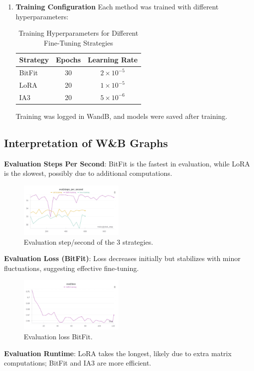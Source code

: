 \documentclass[11pt]{article}
\begin{document}
\begin{enumerate}
\item \textbf{Training Configuration}
Each method was trained with different hyperparameters:
\begin{table}[ht]
\centering
\begin{tabular}{lcc}
\hline
\textbf{Strategy} & \textbf{Epochs} & \textbf{Learning Rate} \\
\hline
BitFit & 30 & \(2 \times 10^{-5}\) \\
LoRA  & 20 & \(1 \times 10^{-5}\) \\
IA3   & 20 & \(5 \times 10^{-6}\) \\
\hline
\end{tabular}
\caption{Training Hyperparameters for Different Fine-Tuning Strategies}
\label{tab:hyperparameters}
\end{table}

Training was logged in WandB, and models were saved after training.
\end{enumerate}
\subsection{Interpretation of W\&B Graphs}
\textbf{Evaluation Steps Per Second}: BitFit is the fastest in evaluation, while LoRA is the slowest, possibly due to additional computations.

        \begin{figure}[H]
      \centering
      \includegraphics[width=0.45\textwidth]{images/3.eval_steps_per_sec.jpg}
      \caption{Evaluation step/second of the 3 strategies.}
      \label{fig:results}
    \end{figure}
\textbf{Evaluation Loss (BitFit)}: Loss decreases initially but stabilizes with minor fluctuations, suggesting effective fine-tuning.

    \begin{figure}[H]
  \centering
  \includegraphics[width=0.45\textwidth]{images/3.eval_loss_bitfit.jpg}
  \caption{Evaluation loss BitFit.}
  \label{fig:results}
\end{figure}    
\textbf{Evaluation Runtime}: LoRA takes the longest, likely due to extra matrix computations; BitFit and IA3 are more efficient.
\end{document}
